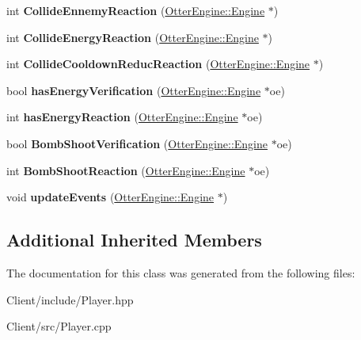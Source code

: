 \begin{DoxyCompactItemize}
\item 
int {\bfseries Collide\+Ennemy\+Reaction} (\hyperlink{class_otter_engine_1_1_engine}{Otter\+Engine\+::\+Engine} $\ast$)\hypertarget{class_player_a3780fb6e608091e82f0fa862e9970f89}{}\label{class_player_a3780fb6e608091e82f0fa862e9970f89}

\item 
int {\bfseries Collide\+Energy\+Reaction} (\hyperlink{class_otter_engine_1_1_engine}{Otter\+Engine\+::\+Engine} $\ast$)\hypertarget{class_player_a78aaafb4e89498610a408f5482c9ba00}{}\label{class_player_a78aaafb4e89498610a408f5482c9ba00}

\item 
int {\bfseries Collide\+Cooldown\+Reduc\+Reaction} (\hyperlink{class_otter_engine_1_1_engine}{Otter\+Engine\+::\+Engine} $\ast$)\hypertarget{class_player_a912e86567a101dd263cf9073c6976c0e}{}\label{class_player_a912e86567a101dd263cf9073c6976c0e}

\item 
bool {\bfseries has\+Energy\+Verification} (\hyperlink{class_otter_engine_1_1_engine}{Otter\+Engine\+::\+Engine} $\ast$oe)\hypertarget{class_player_a19a155b2728c35923c95856176927d3d}{}\label{class_player_a19a155b2728c35923c95856176927d3d}

\item 
int {\bfseries has\+Energy\+Reaction} (\hyperlink{class_otter_engine_1_1_engine}{Otter\+Engine\+::\+Engine} $\ast$oe)\hypertarget{class_player_a2de9cf4f3e5979fa650a07284fc2cc36}{}\label{class_player_a2de9cf4f3e5979fa650a07284fc2cc36}

\item 
bool {\bfseries Bomb\+Shoot\+Verification} (\hyperlink{class_otter_engine_1_1_engine}{Otter\+Engine\+::\+Engine} $\ast$oe)\hypertarget{class_player_a56aabdfac50ed645ee4a2ae523414b99}{}\label{class_player_a56aabdfac50ed645ee4a2ae523414b99}

\item 
int {\bfseries Bomb\+Shoot\+Reaction} (\hyperlink{class_otter_engine_1_1_engine}{Otter\+Engine\+::\+Engine} $\ast$oe)\hypertarget{class_player_aaaca9914218e56a7d76dc948da704b8b}{}\label{class_player_aaaca9914218e56a7d76dc948da704b8b}

\item 
void {\bfseries update\+Events} (\hyperlink{class_otter_engine_1_1_engine}{Otter\+Engine\+::\+Engine} $\ast$)\hypertarget{class_player_a4c613e5b52cf238bc76826e21f69063a}{}\label{class_player_a4c613e5b52cf238bc76826e21f69063a}

\end{DoxyCompactItemize}
\subsection*{Additional Inherited Members}


The documentation for this class was generated from the following files\+:\begin{DoxyCompactItemize}
\item 
Client/include/Player.\+hpp\item 
Client/src/Player.\+cpp\end{DoxyCompactItemize}
